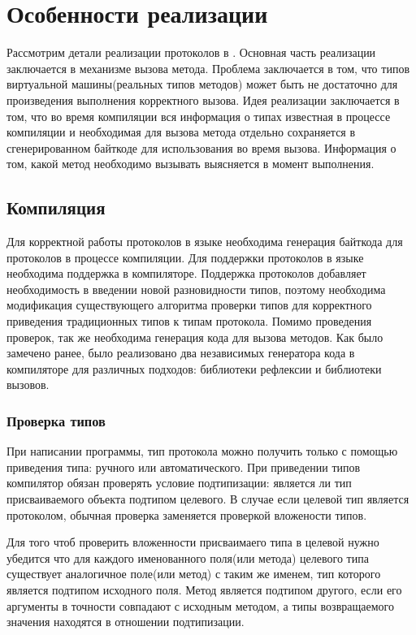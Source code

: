 \section{Особенности реализации}
Рассмотрим детали реализации протоколов в . Основная часть реализации заключается в механизме вызова метода. Проблема заключается в том, что типов виртуальной машины(реальных типов методов) может быть не достаточно для произведения выполнения корректного вызова. Идея реализации заключается в том, что во время компиляции вся информация о типах известная в процессе компиляции и необходимая для вызова метода отдельно сохраняется в сгенерированном байткоде для использования во время вызова. Информация о том, какой метод необходимо вызывать выясняется в момент выполнения.

\subsection{Компиляция}
Для корректной работы протоколов в языке необходима генерация байткода для протоколов в процессе компиляции. Для поддержки протоколов в языке  необходима поддержка в компиляторе. Поддержка протоколов добавляет необходимость в введении новой разновидности типов, поэтому необходима модификация существующего алгоритма проверки типов для корректного приведения традиционных типов к типам протокола. Помимо проведения проверок, так же необходима генерация кода для вызова методов. Как было замечено ранее, было реализовано два независимых генератора кода в компиляторе для различных подходов: библиотеки рефлексии и библиотеки вызовов.

\subsubsection{Проверка типов}
При написании программы, тип протокола можно получить только с помощью приведения типа: ручного или автоматического. При приведении типов компилятор обязан проверять условие подтипизации: является ли тип присваиваемого объекта подтипом целевого. В случае если целевой тип является протоколом, обычная проверка заменяется проверкой вложености типов.

Для того чтоб проверить вложенности присваимаего типа в целевой нужно убедится что для каждого именованного поля(или метода) целевого типа существует аналогичное поле(или метод) с таким же именем, тип которого является подтипом исходного поля. Метод является подтипом другого, если его аргументы в точности совпадают с исходным методом, а типы возвращаемого значения находятся в отношении подтипизации.

